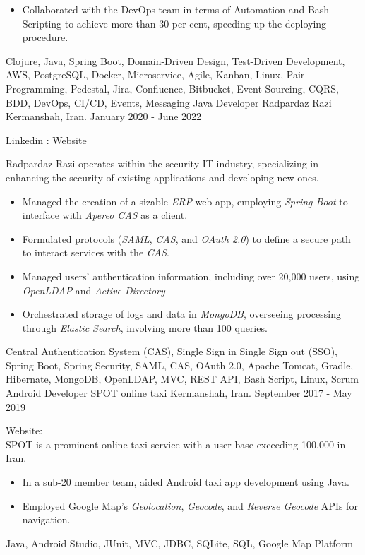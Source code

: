 \begin{experiences}
{\begin{itemize}
   \item Collaborated with the DevOps team in terms of Automation and Bash Scripting to achieve more than 30 per cent, speeding up the deploying procedure.
   \end{itemize}}{Clojure, Java, Spring Boot, Domain-Driven Design, Test-Driven Development, AWS, PostgreSQL, Docker, Microservice, Agile, Kanban, Linux, Pair Programming, Pedestal, Jira, Confluence, Bitbucket, Event Sourcing, CQRS, BDD, DevOps, CI/CD, Events, Messaging}
  \emptySeparator 
\experience
{}
{Java Developer}
{Radpardaz Razi}
{Kermanshah, Iran. \hspace{170 pt} January 2020 - June 2022}
{}
{
Linkedin : 
Website 
\par{Radpardaz Razi operates within the security IT industry, specializing in enhancing the security of existing applications and developing new ones.}
\begin{itemize}
\item Managed the creation of a sizable \emph{ERP} web app, employing \emph{Spring Boot} to interface with \emph{Apereo CAS} as a client.
\item Formulated protocols (\emph{SAML}, \emph{CAS}, and \emph{OAuth 2.0}) to define a secure path to interact services with the \textit{CAS}.
\item Managed users' authentication information, including over 20,000 users, using \emph{OpenLDAP} and \emph{Active Directory}
\item Orchestrated storage of logs and data in \emph{MongoDB}, overseeing processing through \emph{Elastic Search}, involving more than 100 queries.
\end{itemize}
}{Central Authentication System (CAS), Single Sign in Single Sign out (SSO), Spring Boot, Spring Security, SAML, CAS, OAuth 2.0, Apache Tomcat, Gradle, Hibernate, MongoDB, OpenLDAP, MVC, REST API, Bash Script, Linux, Scrum}
\emptySeparator
\experience
  {}
  {Android Developer}
  {SPOT online taxi}
  {Kermanshah, Iran. \hspace{140 pt} September 2017 - May 2019}
  {}
  {
  Website: \\
  SPOT is a prominent online taxi service with a user base exceeding 100,000 in Iran. 
  \begin{itemize}
    \item In a sub-20 member team, aided Android taxi app development using Java.
    \item Employed Google Map's \emph{Geolocation}, \emph{Geocode}, and \emph{Reverse Geocode} APIs for navigation.\end{itemize}
  }{Java, Android Studio, JUnit, MVC, JDBC, SQLite, SQL, Google Map Platform}


\end{experiences}
